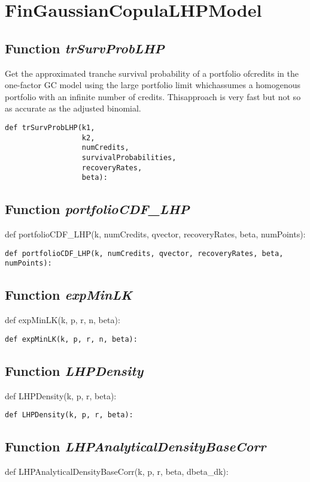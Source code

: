\documentclass[twoside,11pt]{book}
\begin{document}
\newpage
\section{FinGaussianCopulaLHPModel}

\subsection{Function {\it trSurvProbLHP}}
Get the approximated tranche survival probability of a portfolio ofcredits in the one-factor GC model using the large portfolio limit whichassumes a homogenous portfolio with an infinite number of credits. Thisapproach is very fast but not so as accurate as the adjusted binomial. 

\begin{lstlisting}
def trSurvProbLHP(k1,
                  k2,
                  numCredits,
                  survivalProbabilities,
                  recoveryRates,
                  beta):
\end{lstlisting}

\subsection{Function {\it portfolioCDF\_LHP}}
def portfolioCDF\_LHP(k, numCredits, qvector, recoveryRates, beta, numPoints):

\begin{lstlisting}
def portfolioCDF_LHP(k, numCredits, qvector, recoveryRates, beta, numPoints):
\end{lstlisting}

\subsection{Function {\it expMinLK}}
def expMinLK(k, p, r, n, beta):

\begin{lstlisting}
def expMinLK(k, p, r, n, beta):
\end{lstlisting}

\subsection{Function {\it LHPDensity}}
def LHPDensity(k, p, r, beta):

\begin{lstlisting}
def LHPDensity(k, p, r, beta):
\end{lstlisting}

\subsection{Function {\it LHPAnalyticalDensityBaseCorr}}
def LHPAnalyticalDensityBaseCorr(k, p, r, beta, dbeta\_dk):
\end{document}
